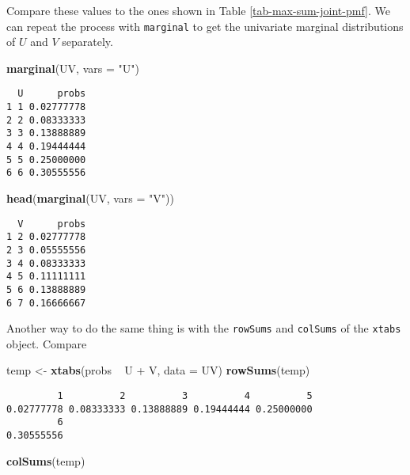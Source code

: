 \documentclass[]{book}
\newenvironment{Shaded}{\begin{snugshade}}{\end{snugshade}}
\newcommand{\KeywordTok}[1]{\textcolor[rgb]{0.13,0.29,0.53}{\textbf{{#1}}}}
\newcommand{\DataTypeTok}[1]{\textcolor[rgb]{0.13,0.29,0.53}{{#1}}}
\newcommand{\StringTok}[1]{\textcolor[rgb]{0.31,0.60,0.02}{{#1}}}
\newcommand{\NormalTok}[1]{{#1}}
\numberwithin{equation}{chapter}
\numberwithin{figure}{chapter}
\theoremstyle{plain}
\theoremstyle{definition}
\theoremstyle{remark}
\theoremstyle{definition}
\theoremstyle{definition}
\theoremstyle{remark}
\begin{document}
Compare these values to the ones shown in Table
\ref{tab-max-sum-joint-pmf}. We can repeat the process with
\texttt{marginal} to get the univariate marginal distributions of \(U\)
and \(V\) separately.

\begin{Shaded}
\begin{Highlighting}[]
\KeywordTok{marginal}\NormalTok{(UV, }\DataTypeTok{vars =} \StringTok{"U"}\NormalTok{)}
\end{Highlighting}
\end{Shaded}

\begin{verbatim}
  U      probs
1 1 0.02777778
2 2 0.08333333
3 3 0.13888889
4 4 0.19444444
5 5 0.25000000
6 6 0.30555556
\end{verbatim}

\begin{Shaded}
\begin{Highlighting}[]
\KeywordTok{head}\NormalTok{(}\KeywordTok{marginal}\NormalTok{(UV, }\DataTypeTok{vars =} \StringTok{"V"}\NormalTok{))}
\end{Highlighting}
\end{Shaded}

\begin{verbatim}
  V      probs
1 2 0.02777778
2 3 0.05555556
3 4 0.08333333
4 5 0.11111111
5 6 0.13888889
6 7 0.16666667
\end{verbatim}

Another way to do the same thing is with the \texttt{rowSums} and
\texttt{colSums} of the \texttt{xtabs} object. Compare

\begin{Shaded}
\begin{Highlighting}[]
\NormalTok{temp <-}\StringTok{ }\KeywordTok{xtabs}\NormalTok{(probs ~}\StringTok{ }\NormalTok{U +}\StringTok{ }\NormalTok{V, }\DataTypeTok{data =} \NormalTok{UV)}
\KeywordTok{rowSums}\NormalTok{(temp)}
\end{Highlighting}
\end{Shaded}

\begin{verbatim}
         1          2          3          4          5 
0.02777778 0.08333333 0.13888889 0.19444444 0.25000000 
         6 
0.30555556 
\end{verbatim}

\begin{Shaded}
\begin{Highlighting}[]
\KeywordTok{colSums}\NormalTok{(temp)}
\end{Highlighting}
\end{Shaded}
\end{document}
